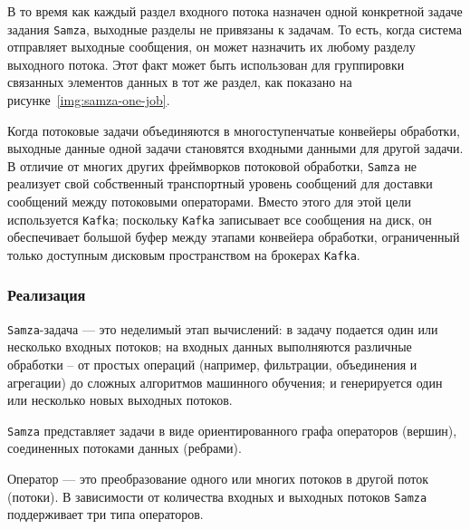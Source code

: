 В то время как каждый раздел входного потока назначен одной конкретной задаче задания \texttt{Samza}, выходные разделы не привязаны к задачам. 
То есть, когда система отправляет выходные сообщения, он может назначить их любому разделу выходного потока. 
Этот факт может быть использован для группировки связанных элементов данных в тот же раздел, как показано на рисунке~\ref{img:samza-one-job}.


Когда потоковые задачи объединяются в многоступенчатые конвейеры обработки, выходные данные одной задачи становятся входными данными для другой задачи. 
В отличие от многих других фреймворков потоковой обработки, \texttt{Samza} не реализует свой собственный транспортный уровень сообщений для доставки сообщений между потоковыми операторами. 
Вместо этого для этой цели используется \texttt{Kafka}; поскольку \texttt{Kafka} записывает все сообщения на диск, он обеспечивает большой буфер между этапами конвейера обработки, ограниченный только доступным дисковым пространством на брокерах \texttt{Kafka}.

\subsubsection{Реализация}

\texttt{Samza}-задача --- это неделимый этап вычислений: в задачу подается один или несколько входных потоков; на входных данных выполняются различные обработки -- от простых операций (например, фильтрации, объединения и агрегации) до сложных алгоритмов машинного обучения; и генерируется один или несколько новых выходных потоков.

\texttt{Samza} представляет задачи в виде ориентированного графа операторов (вершин), соединенных потоками данных (ребрами).

Оператор --- это преобразование одного или многих потоков в другой поток (потоки). В зависимости от количества входных и выходных потоков \texttt{Samza} поддерживает три типа операторов.

